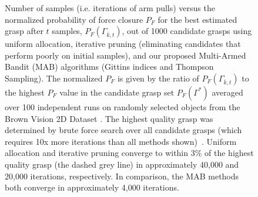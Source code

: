\documentclass[10pt, conference]{ieeeconf}      %
\begin{document}
\begin{figure}%
    \centering

     \caption{Number of samples (i.e. iterations of arm pulls) versus the normalized probability of force closure $P_F$ for the best estimated grasp 
        after $t$ samples, $P_F(\Gamma_{\bar{k}, t})$, out of 1000 candidate grasps using uniform allocation, iterative pruning (eliminating candidates that perform poorly on initial samples), and our proposed Multi-Armed Bandit (MAB) algorithms (Gittins indices and Thompson Sampling).
    The normalized $P_F$ is given by the ratio of $P_F(\Gamma_{\bar{k}, t})$ to the highest $P_F$ value in the candidate
    grasp set $P_F(\Gamma^*)$ averaged over 100 independent runs on randomly selected objects from the Brown Vision 2D Dataset \cite{brown}.
    The highest quality grasp was determined by brute force search over all candidate grasps (which requires 10x more
    iterations than all methods shown)~\cite{kehoe2012toward}.
    Uniform allocation and iterative pruning converge to within 3$\%$ of the highest quality grasp (the dashed grey line) in approximately 40,000 and 20,000 iterations, respectively. In comparison, the MAB methods both converge in approximately 4,000 iterations. 
%    
	}
    \label{fig:grasp_quality}
\end{figure}
\end{document}
